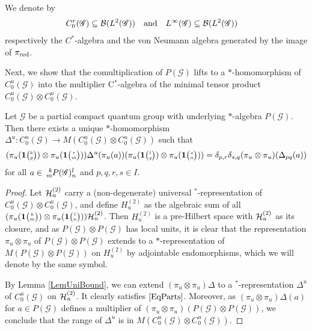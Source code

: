 We denote by
\begin{align}
  C^{r}_{0}(\mathscr{G}) &\subseteq {\cal B}(L^{2}(\mathscr{G})) &&\text{and} & L^{\infty}(\mathscr{G}) &\subseteq {\cal B}(L^{2}(\mathscr{G}))
\end{align}
respectively the $C^{*}$-algebra and the von Neumann algebra generated by the image
of $\pi_{\operatorname{\mathrm{red}}}$.


Next, we show that the comultiplication of $P(\mathscr{G})$ lifts to a $*$-homomorphism  of
$C^{u}_{0}(\mathscr{G})$ into the multiplier C$^*$-algebra of the minimal tensor product
$C^{u}_{0}(\mathscr{G}) \otimes
C^{u}_{0}(\mathscr{G})$.


\begin{Prop}
Let $\mathscr{G}$ be a partial compact quantum group with underlying
$*$-algebra $P(\mathscr{G})$. Then  there exists a unique $*$-homomorphism $\Delta^{u}\colon
  C^{u}_{0}(\mathscr{G}) \to M(C^{u}_{0}(\mathscr{G}) \otimes
  C^{u}_{0}(\mathscr{G}))$ such that 
  \begin{equation}\label{EqParts}
    (\pi_u(\mathbf{1}{\tiny {\begin{pmatrix} k\\p\end{pmatrix}}}) \otimes
    \pi_u(\mathbf{1}{\tiny {\begin{pmatrix} r\\m\end{pmatrix}}}))\Delta^{u}(\pi_{u}(a))(\pi_u(\mathbf{1}{\tiny {\begin{pmatrix} l\\q\end{pmatrix}}})\otimes \pi_u(\mathbf{1}{\tiny {\begin{pmatrix} s\\n\end{pmatrix}}})) =\delta_{p,r}\delta_{s,q}
    (\pi_{u}  \otimes \pi_{u})(\Delta_{pq}(a))
  \end{equation}
  for all $a \in \Gr{P(\mathscr{G})}{k}{l}{m}{n}$ and $p,q,r,s\in I$.
\end{Prop}
\begin{proof}
Let $\mathcal{H}_u^{(2)}$ carry a (non-degenerate) universal $^*$-representation of $C_0^u(\mathscr{G})\otimes C_0^u(\mathscr{G})$, and define $H_u^{(2)}$ as the algebraic sum of all $(\pi_u(\mathbf{1}{\tiny {\begin{pmatrix} k\\m\end{pmatrix}}}) \otimes \pi_u(\mathbf{1}{\tiny {\begin{pmatrix} l\\n\end{pmatrix}}}))\mathcal{H}_u^{(2)}$. Then $H_u^{(2)}$ is a pre-Hilbert space with $\mathcal{H}_u^{(2)}$ as its closure, and as $P(\mathscr{G})\otimes P(\mathscr{G})$ has local units, it is clear that the representation $\pi_u\otimes \pi_u$ of $P(\mathscr{G})\otimes P(\mathscr{G})$ extends to a $ *$-representation of $M(P(\mathscr{G})\otimes P(\mathscr{G}))$ on $H_u^{(2)}$ by adjointable endomorphisms, which we will denote by the same symbol.

By Lemma \ref{LemUniBound}, we can extend $(\pi_u\otimes \pi_u)\Delta$ to a $^*$-representation $\Delta^u$ of $C_0^u(\mathscr{G})$ on $\mathcal{H}_u^{(2)}$. It clearly satisfies $\eqref{EqParts}$. Moreover, as $(\pi_u\otimes \pi_u)\Delta(a)$ for $a\in P(\mathscr{G})$ defines a multiplier of $(\pi_u\otimes \pi_u)(P(\mathscr{G})\otimes P(\mathscr{G}))$, we conclude that the range of $\Delta^u$ is in $M(C_0^u(\mathscr{G})\otimes C_0^u(\mathscr{G}))$.
\end{proof}

